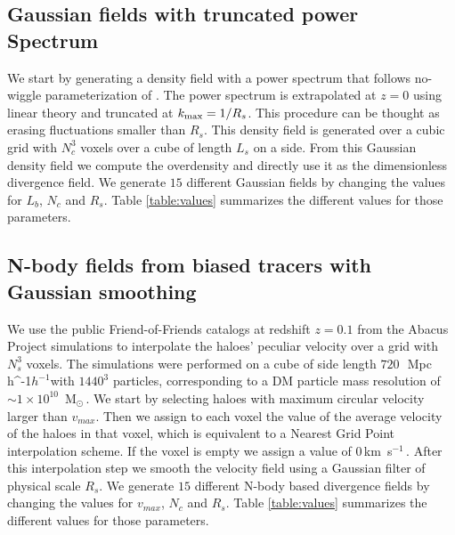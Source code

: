 \documentclass[usenatbib]{mnras}
\newcommand{\Msun}{\,{\rm M}$_{\odot}$\,}
\newcommand{\Mpch}{\,{\rm Mpc}\,\ifmmode h^{-1}\else $h^{-1}$\fi}
\newcommand{\kms}{\,{\rm km}\ s$^{-1}$\,}
\begin{document}
\subsection{Gaussian fields with truncated power Spectrum}

We start by generating a density field with a power spectrum that follows no-wiggle parameterization of \cite{1998ApJ...496..605E}.
The power spectrum is extrapolated at $z=0$ using linear theory and truncated at $k_{\rm max}=1/R_s$.
This procedure can be thought as erasing fluctuations smaller than $R_s$.
This density field is generated over a cubic grid with $N_c^3$ voxels over a cube of length $L_s$ on a side.
From this Gaussian density field we compute  the overdensity and directly use it as the dimensionless divergence field.
We generate $15$ different Gaussian fields by changing the values for $L_b$, $N_c$ and $R_s$. 
Table \ref{table:values} summarizes the different values for those parameters.

\subsection{N-body fields from biased tracers with Gaussian smoothing}

We use the public Friend-of-Friends catalogs at redshift $z=0.1$
from the Abacus Project simulations \citep{2018ApJS..236...43G} to interpolate the haloes' peculiar velocity over a grid with $N_s^3$ voxels.
The simulations were performed on a cube of side length $720$\ \Mpch with
$1440^3$ particles, corresponding to a DM particle mass resolution of $\sim 1 \times 10^{10}$ \Msun.
We start by selecting haloes with maximum circular velocity larger
than $v_{max}$.
Then we assign to each voxel the value of the average velocity of the haloes in that voxel, which is equivalent to a Nearest Grid Point interpolation scheme. 
If the voxel is empty we assign a value of $0$\kms.
After this interpolation step we smooth the velocity field using a Gaussian filter of physical scale $R_s$.
We generate $15$ different N-body based divergence fields by changing the values for $v_{max}$, $N_c$ and $R_s$. 
Table \ref{table:values} summarizes the different values for those parameters.
\end{document}
